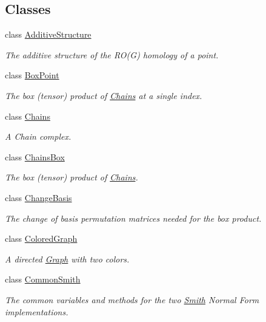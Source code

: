 \subsection*{Classes}
\begin{DoxyCompactItemize}
\item 
class \hyperlink{classMackey_1_1AdditiveStructure}{Additive\+Structure}
\begin{DoxyCompactList}\small\item\em The additive structure of the R\+O(\+G) homology of a point. \end{DoxyCompactList}\item 
class \hyperlink{classMackey_1_1BoxPoint}{Box\+Point}
\begin{DoxyCompactList}\small\item\em The box (tensor) product of \hyperlink{classMackey_1_1Chains}{Chains} at a single index. \end{DoxyCompactList}\item 
class \hyperlink{classMackey_1_1Chains}{Chains}
\begin{DoxyCompactList}\small\item\em A Chain complex. \end{DoxyCompactList}\item 
class \hyperlink{classMackey_1_1ChainsBox}{Chains\+Box}
\begin{DoxyCompactList}\small\item\em The box (tensor) product of \hyperlink{classMackey_1_1Chains}{Chains}. \end{DoxyCompactList}\item 
class \hyperlink{classMackey_1_1ChangeBasis}{Change\+Basis}
\begin{DoxyCompactList}\small\item\em The change of basis permutation matrices needed for the box product. \end{DoxyCompactList}\item 
class \hyperlink{classMackey_1_1ColoredGraph}{Colored\+Graph}
\begin{DoxyCompactList}\small\item\em A directed \hyperlink{classMackey_1_1Graph}{Graph} with two colors. \end{DoxyCompactList}\item 
class \hyperlink{classMackey_1_1CommonSmith}{Common\+Smith}
\begin{DoxyCompactList}\small\item\em The common variables and methods for the two \hyperlink{classMackey_1_1Smith}{Smith} Normal Form implementations. \end{DoxyCompactList}\item 

\end{DoxyCompactItemize}
